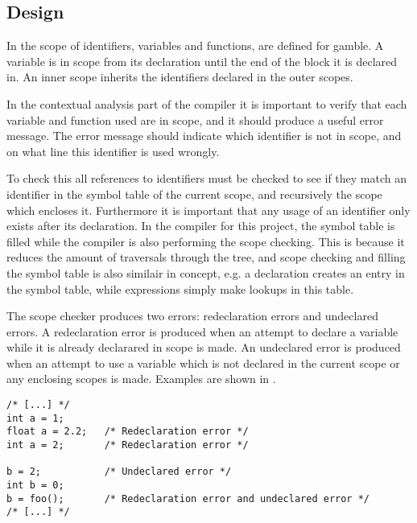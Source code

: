 \subsection*{Design}
In  the scope of identifiers, variables and functions, are defined for \gls{gamble}.
A variable is in scope from its declaration until the end of the block it is declared in.
An inner scope inherits the identifiers declared in the outer scopes. 

In the contextual analysis part of the compiler it is important to verify that each variable and function used are in scope, and it should produce a useful error message.
The error message should indicate which identifier is not in scope, and on what line this identifier is used wrongly.

To check this all references to identifiers must be checked to see if they match an identifier in the symbol table of the current scope, and recursively the scope which encloses it. 
Furthermore it is important that any usage of an identifier only exists after its declaration.
In the compiler for this project, the symbol table is filled while the compiler is also performing the scope checking.
This is because it reduces the amount of traversals through the tree, and scope checking and filling the symbol table is also similair in concept, e.g. a declaration creates an entry in the symbol table, while expressions simply make lookups in this table.

The scope checker produces two errors: redeclaration errors and undeclared errors.
A redeclaration error is produced when an attempt to declare a variable while it is already declarared in scope is made.
An undeclared error is produced when an attempt to use a variable which is not declared in the current scope or any enclosing scopes is made. 
Examples are shown in .

\begin{lstlisting}[caption=Examples of scope errors in \gls{gamble}, numbers=none,frame=tlrb,label={lst:scopeErrors}]
/* [...] */
int a = 1;
float a = 2.2;   /* Redeclaration error */
int a = 2;       /* Redeclaration error */ 

b = 2;           /* Undeclared error */   
int b = 0;
b = foo();       /* Redeclaration error and undeclared error */ 
/* [...] */
\end{lstlisting}


